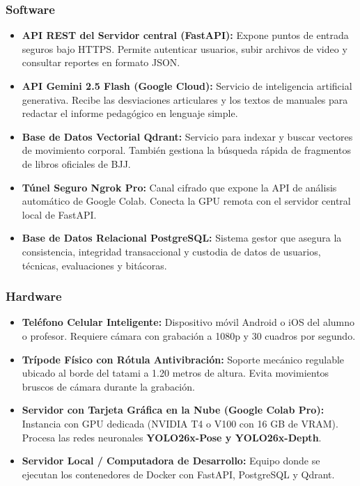 \documentclass[12pt,letterpaper]{article}
\begin{document}
\subsubsection{Software}
\begin{itemize}
    \item \textbf{API REST del Servidor central (FastAPI):} Expone puntos de entrada seguros bajo HTTPS. Permite autenticar usuarios, subir archivos de video y consultar reportes en formato JSON.
    \item \textbf{API Gemini 2.5 Flash (Google Cloud):} Servicio de inteligencia artificial generativa. Recibe las desviaciones articulares y los textos de manuales para redactar el informe pedagógico en lenguaje simple.
    \item \textbf{Base de Datos Vectorial Qdrant:} Servicio para indexar y buscar vectores de movimiento corporal. También gestiona la búsqueda rápida de fragmentos de libros oficiales de BJJ.
    \item \textbf{Túnel Seguro Ngrok Pro:} Canal cifrado que expone la API de análisis automático de Google Colab. Conecta la GPU remota con el servidor central local de FastAPI.
    \item \textbf{Base de Datos Relacional PostgreSQL:} Sistema gestor que asegura la consistencia, integridad transaccional y custodia de datos de usuarios, técnicas, evaluaciones y bitácoras.
\end{itemize}

\subsubsection{Hardware}
\begin{itemize}
    \item \textbf{Teléfono Celular Inteligente:} Dispositivo móvil Android o iOS del alumno o profesor. Requiere cámara con grabación a 1080p y 30 cuadros por segundo.
    \item \textbf{Trípode Físico con Rótula Antivibración:} Soporte mecánico regulable ubicado al borde del tatami a 1.20 metros de altura. Evita movimientos bruscos de cámara durante la grabación.
    \item \textbf{Servidor con Tarjeta Gráfica en la Nube (Google Colab Pro):} Instancia con GPU dedicada (NVIDIA T4 o V100 con 16 GB de VRAM). Procesa las redes neuronales \textbf{YOLO26x-Pose y YOLO26x-Depth}.
    \item \textbf{Servidor Local / Computadora de Desarrollo:} Equipo donde se ejecutan los contenedores de Docker con FastAPI, PostgreSQL y Qdrant.
\end{itemize}
\end{document}
